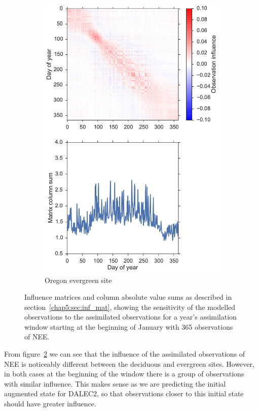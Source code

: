 \begin{figure}[ht]
\begin{subfigure}[b]{0.46\textwidth}
        \includegraphics[width=\textwidth]{chapter/chapter5/inf_mat_so.pdf}
        \caption{Oregon evergreen site}
        \label{chap5:fig:oregon_inf_mat}
    \end{subfigure}
    \caption{Influence matrices and column absolute value sums as described in section~\ref{chap5:sec:inf_mat}, showing the sensitivity of the modelled observations to the assimilated observations for a year's assimilation window starting at the beginning of January with 365 observations of NEE.}
    \label{chap5:fig:inf_mats}
\end{figure}

From figure~\ref{chap5:fig:inf_mats} we can see that the influence of the assimilated observations of NEE is noticeably different between the deciduous and evergreen sites. However, in both cases at the beginning of the window there is a group of observations with similar influence. This makes sense as we are predicting the initial augmented state for DALEC2, so that observations closer to this initial state should have greater influence. 

